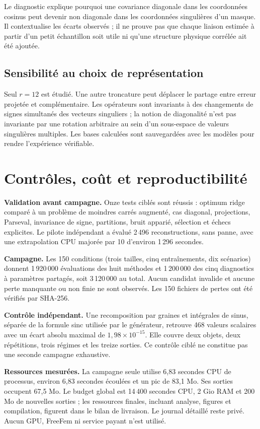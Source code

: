 \documentclass[11pt,a4paper]{article}
\begin{document}
Le diagnostic explique pourquoi une covariance diagonale dans les coordonnées cosinus peut devenir non diagonale dans les coordonnées singulières d'un masque. Il contextualise les écarts observés ; il ne prouve pas que chaque liaison estimée à partir d'un petit échantillon soit utile ni qu'une structure physique corrélée ait été ajoutée.

\subsection{Sensibilité au choix de représentation}
Seul $r=12$ est étudié. Une autre troncature peut déplacer le partage entre erreur projetée et complémentaire. Les opérateurs sont invariants à des changements de signes simultanés des vecteurs singuliers ; la notion de diagonalité n'est pas invariante par une rotation arbitraire au sein d'un sous-espace de valeurs singulières multiples. Les bases calculées sont sauvegardées avec les modèles pour rendre l'expérience vérifiable.

\newpage
\section{Contrôles, coût et reproductibilité}
\textbf{Validation avant campagne.} Onze tests ciblés sont réussis : optimum ridge comparé à un problème de moindres carrés augmenté, cas diagonal, projections, Parseval, invariance de signe, partitions, bruit apparié, sélection et échecs explicites. Le pilote indépendant a évalué 2\,496 reconstructions, sans panne, avec une extrapolation CPU majorée par 10 d'environ 1\,296 secondes.

\textbf{Campagne.} Les 150 conditions (trois tailles, cinq entraînements, dix scénarios) donnent 1\,920\,000 évaluations des huit méthodes et 1\,200\,000 des cinq diagnostics à paramètres partagés, soit 3\,120\,000 au total. Aucun candidat invalide et aucune perte manquante ou non finie ne sont observés. Les 150 fichiers de pertes ont été vérifiés par SHA-256.

\textbf{Contrôle indépendant.} Une recomposition par graines et intégrales de sinus, séparée de la formule sinc utilisée par le générateur, retrouve 468 valeurs scalaires avec un écart absolu maximal de $1,98\times10^{-15}$. Elle couvre deux objets, deux répétitions, trois régimes et les treize sorties. Ce contrôle ciblé ne constitue pas une seconde campagne exhaustive.

\textbf{Ressources mesurées.} La campagne seule utilise 6,83 secondes CPU de processus, environ 6,83 secondes écoulées et un pic de 83,1 Mo. Ses sorties occupent 67,5 Mo. Le budget global est 14\,400 secondes CPU, 2 Gio RAM et 200 Mo de nouvelles sorties ; les ressources finales, incluant analyse, figures et compilation, figurent dans le bilan de livraison. Le journal détaillé reste privé. Aucun GPU, FreeFem ni service payant n'est utilisé.
\end{document}
